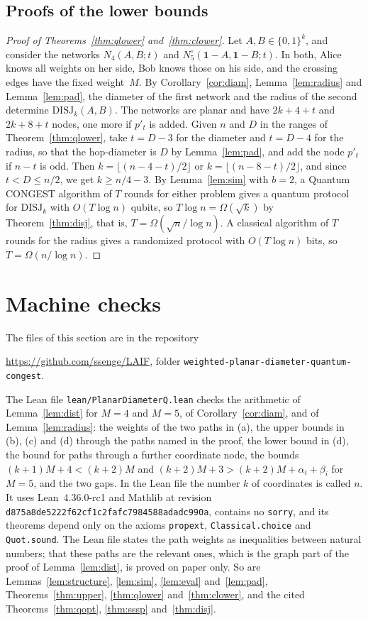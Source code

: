 \documentclass[11pt]{article}
\theoremstyle{definition}
\theoremstyle{remark}
\newcommand{\DISJ}{\mathrm{DISJ}}
\begin{document}
\subsection{Proofs of the lower bounds}

\begin{proof}[Proof of Theorems~\ref{thm:qlower} and~\ref{thm:clower}]
Let $A,B\in\{0,1\}^k$, and consider the networks $N_4(A,B;t)$ and $N^\circ_5(\mathbf 1-A,\mathbf 1-B;t)$. In both, Alice knows all weights on her side, Bob knows those on his side, and the crossing edges have the fixed weight~$M$. By Corollary~\ref{cor:diam}, Lemma~\ref{lem:radius} and Lemma~\ref{lem:pad}, the diameter of the first network and the radius of the second determine $\DISJ_k(A,B)$. The networks are planar and have $2k+4+t$ and $2k+8+t$ nodes, one more if $p'_t$ is added. Given $n$ and $D$ in the ranges of Theorem~\ref{thm:qlower}, take $t=D-3$ for the diameter and $t=D-4$ for the radius, so that the hop-diameter is $D$ by Lemma~\ref{lem:pad}, and add the node $p'_t$ if $n-t$ is odd. Then $k=\lfloor(n-4-t)/2\rfloor$ or $k=\lfloor(n-8-t)/2\rfloor$, and since $t<D\le n/2$, we get $k\ge n/4-3$. By Lemma~\ref{lem:sim} with $b=2$, a Quantum CONGEST algorithm of $T$ rounds for either problem gives a quantum protocol for $\DISJ_k$ with $O(T\log n)$ qubits, so $T\log n=\Omega(\sqrt k)$ by Theorem~\ref{thm:disj}, that is, $T=\Omega(\sqrt n/\log n)$. A classical algorithm of $T$ rounds for the radius gives a randomized protocol with $O(T\log n)$ bits, so $T=\Omega(n/\log n)$.
\end{proof}

\section{Machine checks}\label{sec:checks}

The files of this section are in the repository
\begin{center}
\url{https://github.com/ssenge/LAIF}, folder \texttt{weighted-planar-diameter-quantum-congest}.
\end{center}
The Lean file \texttt{lean/PlanarDiameterQ.lean} checks the arithmetic of Lemma~\ref{lem:dist} for $M=4$ and $M=5$, of Corollary~\ref{cor:diam}, and of Lemma~\ref{lem:radius}: the weights of the two paths in (a), the upper bounds in (b), (c) and (d) through the paths named in the proof, the lower bound in (d), the bound for paths through a further coordinate node, the bounds $(k+1)M+4<(k+2)M$ and $(k+2)M+3>(k+2)M+\alpha_i+\beta_i$ for $M=5$, and the two gaps. In the Lean file the number $k$ of coordinates is called $n$. It uses Lean~4.36.0-rc1 and Mathlib at revision \texttt{d875a8de5222f62cf1c2fafc7984588adadc990a}, contains no \texttt{sorry}, and its theorems depend only on the axioms \texttt{propext}, \texttt{Classical.choice} and \texttt{Quot.sound}. The Lean file states the path weights as inequalities between natural numbers; that these paths are the relevant ones, which is the graph part of the proof of Lemma~\ref{lem:dist}, is proved on paper only. So are Lemmas~\ref{lem:structure}, \ref{lem:sim}, \ref{lem:eval} and~\ref{lem:pad}, Theorems~\ref{thm:upper}, \ref{thm:qlower} and~\ref{thm:clower}, and the cited Theorems~\ref{thm:qopt}, \ref{thm:sssp} and~\ref{thm:disj}.
\end{document}
